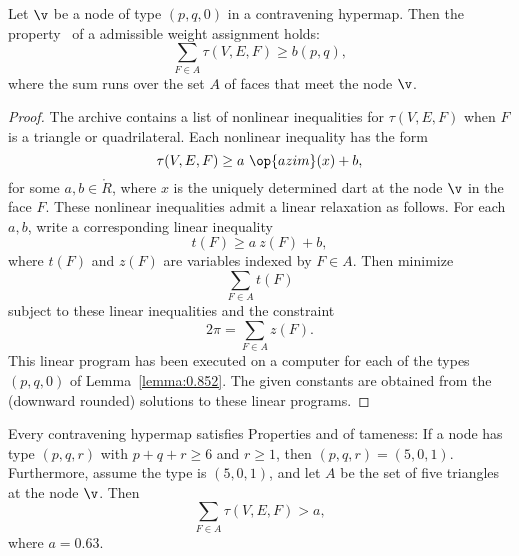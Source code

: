 \begin{lemma}[] \label{lemma:weightB}
  Let $\v$ be a node of type $(p,q,0)$ in a contravening hypermap.
  Then the property~ of a admissible weight assignment
  holds:
\begin{displaymath}
\sum_{ F\in A} \tau(V,E,F) \ge  b(p,q),
\end{displaymath}
where the sum runs over the set $A$ of faces that meet the node $\v$.
\end{lemma}
%
%

\begin{proof}   The archive
  \cite[FUSDSPJ]{hales:2009:nonlinear} contains a list of nonlinear
  inequalities for $\tau(V,E,F)$ when $F$ is a triangle or
  quadrilateral. Each nonlinear inequality has the form
\begin{displaymath}\tau(V,E,F) \ge a~\op{azim}(x) + b,\end{displaymath}
for some $a,b\in\ring{R}$, where $x$ is the uniquely determined dart
at the node $\v$ in the face $F$.  These nonlinear inequalities admit
a linear relaxation as follows.  For each $a,b$, write a corresponding
linear inequality %
%
\begin{displaymath}
t(F) \ge a~z(F) + b,
\end{displaymath}
where $t(F)$ and $z(F)$ are variables indexed by $F\in A$.
%
%
%
Then  minimize 
\begin{displaymath}\sum_{F\in A} t(F)\end{displaymath}
subject to these linear inequalities and the constraint
\begin{displaymath}
2\pi = \sum_{F\in A} z(F).
\end{displaymath}
This linear program has been executed on a computer for each of the
types $(p,q,0)$ of Lemma~\ref{lemma:0.852}. The given constants are
obtained from the (downward rounded) solutions to these linear
programs.
\end{proof}

\begin{lemma}[]\label{lemma:degE}
  Every contravening hypermap satisfies Properties 
  and 
of tameness: 
If a node has type $(p,q,r)$ with $p+q+r\ge 6$ and $r\ge 1$, then $(p,q,r)=(5,0,1)$. 
Furthermore, assume the type is $(5,0,1)$, and let $A$ be the set of five triangles at the
node $\v$.  Then
%
\begin{displaymath}
\sum_{F\in A} \tau(V,E,F) > a,
\end{displaymath}
where $a=0.63$.
\end{lemma}



